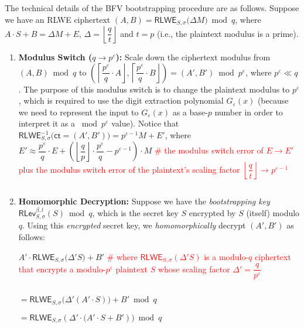 $ $

The technical details of the BFV bootstrapping procedure are as follows. Suppose we have an RLWE ciphertext $(A, B)  = \textsf{RLWE}_{S, \sigma}\bm(\Delta M\bm) \bmod q$, where $A\cdot S + B = \Delta M + E$, \text{ } $\Delta = \left\lfloor\dfrac{q}{t}\right\rfloor$ and $t = p$ (i.e., the plaintext modulus is a prime).

\begin{enumerate}
\item \textbf{Modulus Switch (\boldmath$q \rightarrow p^\varepsilon$):} Scale down the ciphertext modulus from $(A, B) \bmod q$ to $\left(\left\lceil \dfrac{p^\varepsilon}{q}\cdot A\right\rfloor, \left\lceil \dfrac{p^\varepsilon}{q}\cdot B\right\rfloor\right) = (A', B') \bmod p^\varepsilon$, where $p^\varepsilon \ll q$. The purpose of this modulus switch is to change the plaintext modulus to $p^\varepsilon$, which is required to use the digit extraction polynomial $G_\varepsilon(x)$ (because we need to represent the input to $G_\varepsilon(x)$ as a base-$p$ number in order to interpret it as a $\bmod p^\varepsilon$ value). Notice that $\textsf{RLWE}_{S, \sigma}^{-1}\bm(\textsf{ct} = (A', B') \bm) = p^{\varepsilon-1}M + E'$, where $E' \approx \dfrac{p^\varepsilon}{q}\cdot E  + \left(\left\lfloor\dfrac{q}{p}\right\rfloor\cdot\dfrac{p^\varepsilon}{q} - p^{\varepsilon-1}\right)\cdot M$ \textcolor{red}{ \# the modulus switch error of $E \rightarrow E'$ plus the modulus switch error of the plaintext's scaling factor $\left\lfloor\dfrac{q}{t}\right\rfloor \rightarrow p^{\varepsilon-1}$}

$ $

\item \textbf{Homomorphic Decryption:} Suppose we have the \textit{bootstrapping key} $\textsf{RLev}_{S, \sigma}^{\beta, l}(S) \bmod q$, which is the secret key $S$ encrypted by $S$ (itself) modulo $q$. Using this \textit{encrypted} secret key, we \textit{homomorphically} decrypt $(A', B')$ as follows:

$A' \cdot \textsf{RLWE}_{S, \sigma}\bm(\Delta' S\bm) + B'$ \textcolor{red}{ \# where $\textsf{RLWE}_{S, \sigma}(\Delta' S)$ is a modulo-$q$ ciphertext that encrypts a modulo-$p^\varepsilon$ plaintext $S$ whose scaling factor $\Delta' = \dfrac{q}{p^\varepsilon}$ }

$ $

$= \textsf{RLWE}_{S, \sigma}\bm(\Delta' (A' \cdot S)\bm) + B'  \bmod q$

$= \textsf{RLWE}_{S, \sigma}(\Delta' \cdot \bm(A'\cdot S + B')\bm) \bmod q$


\end{enumerate}
